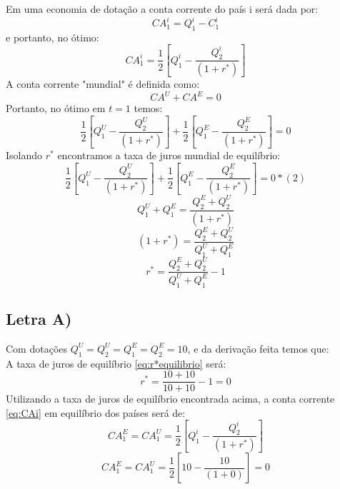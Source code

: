 \documentclass{article}
\begin{document}
Em uma economia de dotação a conta corrente do país i será dada por:
\begin{equation}
    CA_1^{i}=Q_1^{i}-C_1^{i}
\end{equation}
e portanto, no ótimo:
\begin{equation}\label{eq:CAi}
    CA_1^{i}=\frac{1}{2}\left[Q_1^{i}-\frac{Q_2^{i}}{(1+r^*)}\right]
\end{equation}
A conta corrente "mundial" é definida como:
\begin{equation}
    CA^U+CA^E=0
\end{equation}
Portanto, no ótimo em $t=1$ temos:
\begin{equation}
    \frac{1}{2}\left[Q_1^{U}-\frac{Q_2^{U}}{(1+r^*)}\right] + 
    \frac{1}{2}\left[Q_1^{E}-\frac{Q_2^{E}}{(1+r^*)}\right]=0
\end{equation}
Isolando $r^*$ encontramos a taxa de juros mundial de equilíbrio:
\begin{equation}
    \frac{1}{2}\left[Q_1^{U}-\frac{Q_2^{U}}{(1+r^*)}\right] + 
    \frac{1}{2}\left[Q_1^{E}-\frac{Q_2^{E}}{(1+r^*)}\right]=0 *(2)
\end{equation}
\begin{equation}
    Q_1^{U} + Q_1^{E}=\frac{Q_2^{E}+Q_2^{U}}{(1+r^*)}
\end{equation}
\begin{equation}
    (1+r^*)=\frac{Q_2^{E}+Q_2^{U}}{Q_1^{U} + Q_1^{E}}
\end{equation}
\begin{equation}\label{eq:r*equilibrio}
    r^*=\frac{Q_2^{E}+Q_2^{U}}{Q_1^{U} + Q_1^{E}}-1
\end{equation}


\subsection*{Letra A)}
Com dotações $Q_1^U=Q_2^U=Q_1^E=Q_2^E=10$, e da derivação feita temos que:\\
A taxa de juros de equilíbrio \eqref{eq:r*equilibrio} será:
\begin{equation}
    r^*=\frac{10+10}{10+10}-1=0
\end{equation}
Utilizando a taxa de juros de equilíbrio encontrada acima, a conta corrente \eqref{eq:CAi} em equilíbrio dos países será de:
\begin{equation}
    CA_1^{E}=CA_1^{U}=\frac{1}{2}\left[Q_1^{i}-\frac{Q_2^{i}}{(1+r^*)}\right]
\end{equation}
\begin{equation}
    CA_1^{E}=CA_1^{U}=\frac{1}{2}\left[10-\frac{10}{(1+0)}\right]=0
\end{equation}
\end{document}
